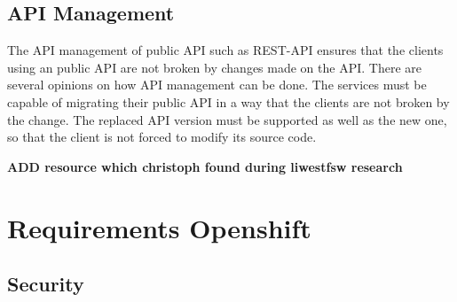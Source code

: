 \subsection{API Management}
\label{sec:esboc-design-api}
The API management of public API such as REST-API ensures that the clients using an public API are not broken by changes made on the API. There are several opinions on how API management can be done. The services must be capable of migrating their public API in a way that the clients are not broken by the change. The replaced API version must be supported as well as the new one, so that the client is not forced to modify its source code.

\textbf{ADD resource which christoph found during liwestfsw research} 


\section{Requirements Openshift}
\label{sec:esboc-design-oc}

\subsection{Security}
\label{sec:esboc-design-security}
